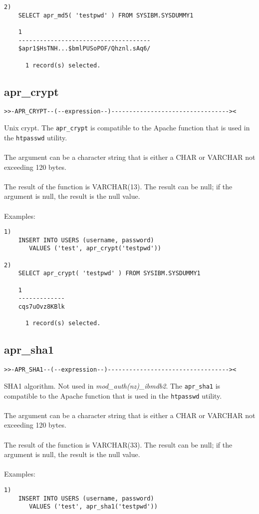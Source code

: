\documentclass[11pt,a4paper]{article}
\begin{document}
\begin{appendix}
\begin{verbatim}
2)
    SELECT apr_md5( 'testpwd' ) FROM SYSIBM.SYSDUMMY1

    1
    -------------------------------------
    $apr1$HsTNH...$bmlPUSoPOF/Qhznl.sAq6/

      1 record(s) selected.
\end{verbatim}
\newpage
\subsection{apr\_crypt} \label{aprcrypt}
\begin{verbatim}
>>-APR_CRYPT--(--expression--)---------------------------------><
\end{verbatim}
Unix crypt. The {\tt apr\_crypt} is compatible to the Apache function that is used in the {\tt htpasswd} utility.\\
\\
The argument can be a character string that is either a \mbox{CHAR} or \mbox{VARCHAR} not exceeding 120 bytes.\\
\\
The result of the function is VARCHAR(13). The result can be null; if the argument is null, the result is the null value.\\
\\
Examples:
\begin{verbatim}
1)
    INSERT INTO USERS (username, password)
       VALUES ('test', apr_crypt('testpwd'))

2)
    SELECT apr_crypt( 'testpwd' ) FROM SYSIBM.SYSDUMMY1

    1
    -------------
    cqs7uOvz8KBlk

      1 record(s) selected.
\end{verbatim}
\newpage
\subsection{apr\_sha1} \label{aprsha1}
\begin{verbatim}
>>-APR_SHA1--(--expression--)----------------------------------><
\end{verbatim}
SHA1 algorithm. Not used in \emph{mod\_auth(nz)\_ibmdb2}. The {\tt apr\_sha1} is compatible to the Apache function that is used in the {\tt htpasswd} utility.\\
\\
The argument can be a character string that is either a \mbox{CHAR} or \mbox{VARCHAR} not exceeding 120 bytes.\\
\\
The result of the function is VARCHAR(33). The result can be null; if the argument is null, the result is the null value.\\
\\
Examples:
\begin{verbatim}
1)
    INSERT INTO USERS (username, password)
       VALUES ('test', apr_sha1('testpwd'))


\end{verbatim}
\end{appendix}
\end{document}
